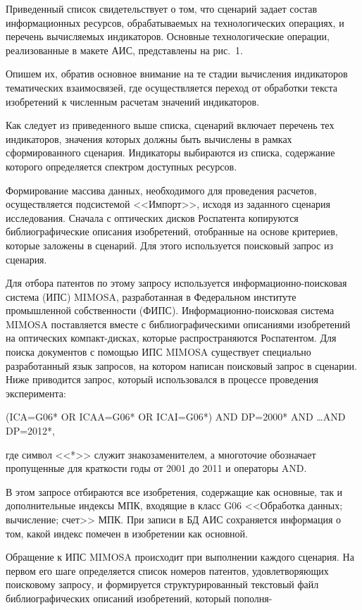 \begin{multicols}{2}
     Приведенный список свидетельствует о том, что сценарий задает состав информационных ресурсов, обрабатываемых на
технологических операциях, и перечень вычисляемых индикаторов. Основные технологические операции,
реализованные в макете АИС, представлены на рис.~1.


     Опишем их, обратив основное внимание на те стадии вычисления индикаторов тематических взаимосвязей, где
осуществляется переход от обработки текста изобретений к численным расчетам значений индикаторов.

     Как следует из приведенного выше списка, сценарий включает перечень тех индикаторов, значения которых
должны быть вычислены в рамках сформированного сценария. Индикаторы выбираются из списка, содержание
которого определяется спектром доступных ресурсов.

     Формирование массива данных, необходимого для проведения расчетов,
     осуществляется под\-сис\-те\-мой
<<Импорт>>, исходя из заданного сценария исследования. Сначала с оптических дисков Роспатента копируются
библиографические описания изобретений, отобранные на основе критериев, которые заложены в сценарий. Для этого
используется поисковый запрос из сценария.

     Для отбора патентов по этому запросу используется
     ин\-фор\-ма\-ци\-он\-но-по\-иско\-вая система (ИПС) MIMOSA, разработанная в Федеральном институте
промышленной собственности (ФИПС). Ин\-фор\-ма\-ци\-он\-но-поиско\-вая
система MIMOSA поставляется вместе с библиографическими описаниями
изобретений на оптических ком\-пакт-дис\-ках, которые распространяются Роспатентом. Для поиска документов с
помощью ИПС MIMOSA существует специально разработанный язык запросов, на котором написан поисковый запрос в
сценарии. Ниже приводится запрос, который использовался в процессе проведения эксперимента:

     \noindent
     {\sf (ICA=G06* OR ICAA=G06* OR ICAI=G06*) AND DP=2000* AND \ldots AND DP=2012*,}

\noindent
где символ <<*>> служит знакозаменителем, а многоточие обозначает пропущенные для краткости годы от 2001 до 2011
и операторы AND.

     В этом запросе отбираются все изобретения, содержащие как основные, так и дополнительные индексы МПК,
входящие в класс G06 <<Обработка данных; вычисление; счет>> МПК. При записи в БД АИС сохраняется
информация о том, какой индекс помечен в изобретении как основной.

     Обращение к ИПС MIMOSA происходит при выполнении каждого сценария. На первом его шаге определяется
список номеров патентов, удовле\-тво\-ря\-ющих поисковому запросу, и формируется структурированный текстовый файл
библиографических описаний изобретений, который пополня-\linebreak\vspace*{-12pt}

\pagebreak

\end{multicols}

